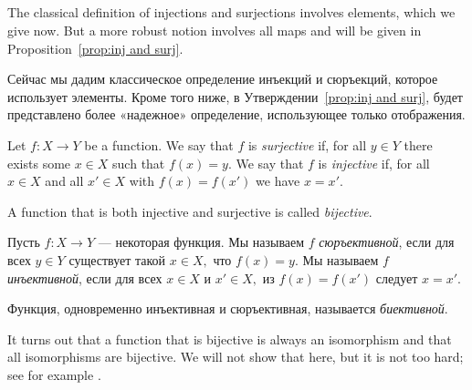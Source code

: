 \documentclass[../main/CT4S-EN-RU]{subfiles}
\begin{document}

\subsection{}

\begin{blockENG}
The classical definition of injections and surjections involves elements, which we give now. But a more robust notion involves all maps and will be given in Proposition~\ref{prop:inj and surj}.
\end{blockENG}

\begin{blockRUS}
Сейчас мы дадим классическое определение инъекций и сюръекций, которое использует элементы. Кроме того ниже, в Утверждении~\ref{prop:inj and surj}, будет представлено более «надежное» определение, использующее только отображения.
\end{blockRUS}

\begin{definitionENG}\label{def:inj,surj,bij}
Let $f\colon X{→} Y$ be a function. We say that $f$ is {\em surjective} if, for all $y\in Y$ there exists some $x\in X$ such that $f(x)=y.$ We say that $f$ is {\em injective} if, for all $x\in X$ and all $x'\in X$ with $f(x)=f(x')$ we have $x=x'.$

A function that is both injective and surjective is called {\em bijective}.
\end{definitionENG}

\begin{definitionRUS}\label{def:inj,surj,bij}
Пусть $f\colon X{→} Y$ — некоторая функция. Мы называем $f$ {\em сюръективной}, если для всех $y\in Y$ существует такой $x\in X,$ что $f(x)=y.$ Мы называем $f$ {\em инъективной}, если для всех $x\in X$ и $x'\in X,$ из $f(x)=f(x')$ следует $x=x'.$

Функция, одновременно инъективная и сюръективная, называется {\em биективной}.
\end{definitionRUS}

\begin{remarkENG}
It turns out that a function that is bijective is always an isomorphism and that all isomorphisms are bijective. We will not show that here, but it is not too hard; see for example \cite[Theorem 5.4]{Big}.
\end{remarkENG}
\end{document}
